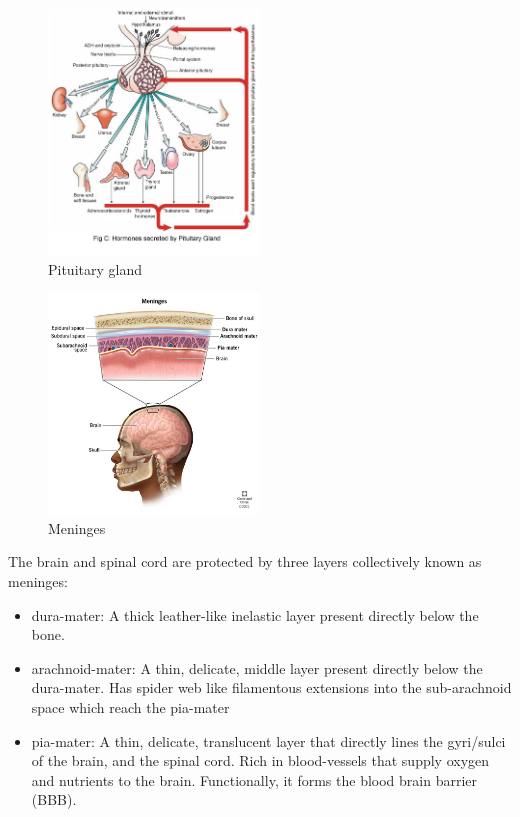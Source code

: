 \documentclass{article}
\begin{document}
\begin{figure}[h]
\centering
\includegraphics[width=0.5\textwidth]{assets/pituitary.png}
\caption{Pituitary gland}
\end{figure}

\begin{figure}[h]
\centering
\includegraphics[width=0.5\textwidth]{assets/menings.png}
\caption{Meninges}
\end{figure}

\noindent The brain and spinal cord are protected by three layers collectively known as meninges:

\begin{itemize}
    \item dura-mater: A thick leather-like inelastic layer present directly below the bone.
    \item arachnoid-mater: A thin, delicate, middle layer present directly below the dura-mater. Has spider web like filamentous extensions into the sub-arachnoid space which reach the pia-mater
    \item pia-mater: A thin, delicate, translucent layer that directly lines the gyri/sulci of the brain, and the spinal cord. Rich in blood-vessels that supply oxygen and nutrients to the brain. Functionally, it forms the blood brain barrier (BBB).
\end{itemize}
\end{document}
